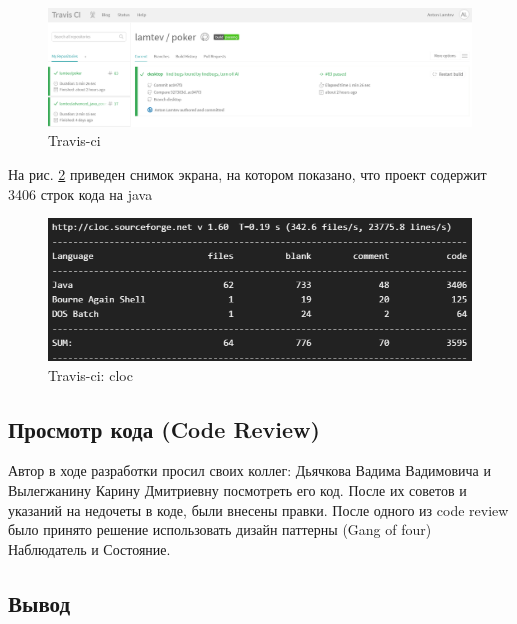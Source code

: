 \begin{figure}[H]
	\begin{center}
		\includegraphics[scale=0.5]{pics/travis2.png}
	    \caption{Travis-ci} 
		\label{pic:travis:2}
	\end{center}
\end{figure}

На рис. \ref{pic:travis:3} приведен снимок экрана, на котором показано, что проект содержит 3406 строк кода на java

\begin{figure}[H]
	\begin{center}
		\includegraphics[scale=0.75]{pics/travis3.png}
	    \caption{Travis-ci: cloc} 
		\label{pic:travis:3}
	\end{center}
\end{figure}

\subsection*{Просмотр кода (Code Review)}

Автор в ходе разработки просил своих коллег: Дьячкова Вадима Вадимовича и Вылегжанину Карину Дмитриевну посмотреть его код. После их советов и указаний на недочеты в коде, были внесены правки. После одного из code review было принято решение использовать дизайн паттерны (Gang of four) Наблюдатель и Состояние.

\subsection*{Вывод}

